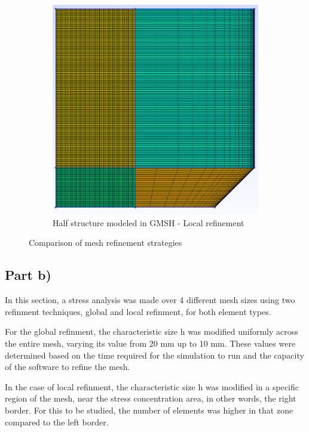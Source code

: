 \begin{figure}[H]
\begin{subfigure}[b]{0.48\textwidth}
        \includegraphics[width=\textwidth]{GRAFICOS/local.png}
        \caption{Half structure modeled in GMSH - Local refinement}
        \label{fig:half_structure_local}
    \end{subfigure}
    \caption{Comparison of mesh refinement strategies}
    \label{fig:mesh_comparison}
\end{figure}

\subsection{Part b)}

In this section, a stress analysis was made over 4 different mesh sizes using two refinment techniques, global and local refinment, for both element types.

For the global refinment, the characteristic size h was modified uniformly across the entire mesh, varying its value from 20 mm up to 10 mm. These values were determined based on the time required for the simulation to run and the capacity of the software to refine the mesh.

In the case of local refinment, the characteristic size h was modified in a specific region of the mesh, near the stress concentration area, in other words, the right border. For this to be studied, the number of elements was higher in that zone compared to the left border.


